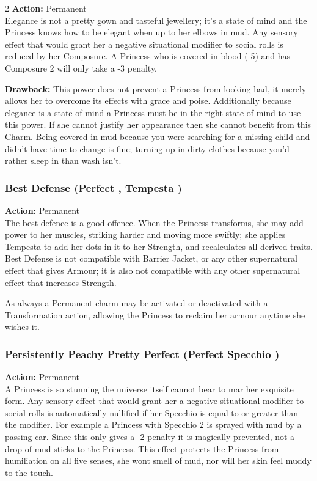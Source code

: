 \begin{multicols}{2}
\noindent \textbf{Action:} Permanent \\

\noindent Elegance is not a pretty gown and tasteful jewellery; it's a state of mind and the Princess knows how to be elegant when up to her elbows in mud. Any sensory effect that would grant her a negative situational modifier to social rolls is reduced by her Composure. A Princess who is covered in blood (-5) and has Composure 2 will only take a -3 penalty.

\textbf{Drawback:} This power does not prevent a Princess from looking bad, it merely allows her to overcome its effects with grace and poise. Additionally because elegance is a state of mind a Princess must be in the right state of mind to use this power. If she cannot justify her appearance then she cannot benefit from this Charm. Being covered in mud because you were searching for a missing child and didn't have time to change is fine; turning up in dirty clothes because you'd rather sleep in than wash isn't.

\subsubsection*{Best Defense (Perfect \textbullet\textbullet, Tempesta \textbullet)}

\noindent \textbf{Action:} Permanent \\

\noindent The best defence is a good offence. When the Princess transforms, she may add power to her muscles, striking harder and moving more swiftly; she applies Tempesta to add her dots in it to her Strength, and recalculates all derived traits. Best Defense is not compatible with Barrier Jacket, or any other supernatural effect that gives Armour; it is also not compatible with any other supernatural effect that increases Strength.

As always a Permanent charm may be activated or deactivated with a Transformation action, allowing the Princess to reclaim her armour anytime she wishes it. 

\subsubsection*{Persistently Peachy Pretty Perfect (Perfect \textbullet\textbullet Specchio \textbullet)}

\noindent \textbf{Action:} Permanent \\

\noindent A Princess is so stunning the universe itself cannot bear to mar her exquisite form. Any sensory effect that would grant her a negative situational modifier to social rolls is automatically nullified if her Specchio is equal to or greater than the modifier. For example a Princess with Specchio 2 is sprayed with mud by a passing car. Since this only gives a -2 penalty it is magically prevented, not a drop of mud sticks to the Princess. This effect protects the Princess from humiliation on all five senses, she wont smell of mud, nor will her skin feel muddy to the touch.


\end{multicols}
